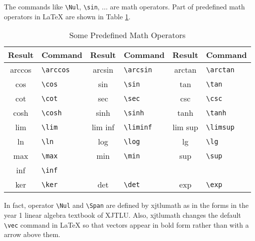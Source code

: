 The commands like \verb=\Nul=, \verb=\sin=, ... are math operators. Part of predefined math operators in \LaTeX{} are shown in Table \ref{tab:predefmathop}.
\begin{table}[hbpt]
\begin{center}
\small
\begin{tabular}{cl|cl|cl}
Result & Command & Result & Command & Result & Command \\
\hline
arccos & \verb=\arccos= & arcsin & \verb=\arcsin= & arctan & \verb=\arctan= \\
cos & \verb=\cos= & sin & \verb=\sin= & tan & \verb=\tan= \\
cot & \verb=\cot= & sec & \verb=\sec= & csc & \verb=\csc= \\
cosh & \verb=\cosh= & sinh & \verb=\sinh= & tanh & \verb=\tanh= \\
lim & \verb=\lim= & lim inf & \verb=\liminf= & lim sup & \verb=\limsup= \\
ln & \verb=\ln= & log & \verb=\log= & lg & \verb=\lg= \\
max & \verb=\max= & min & \verb=\min= & sup & \verb=\sup= \\
inf & \verb=\inf= &  &  &  &  \\
ker & \verb=\ker= & det & \verb=\det= & exp & \verb=\exp= 
\end{tabular}
\end{center}
\caption{Some Predefined Math Operators}
\label{tab:predefmathop}
\end{table}

In fact, operator \verb=\Nul= and \verb=\Span= are defined by xjtlumath as in the forms in the year 1 linear algebra textbook of XJTLU. Also, xjtlumath changes the default \verb=\vec= command in \LaTeX{} so that vectors appear in bold form rather than with a arrow above them.

